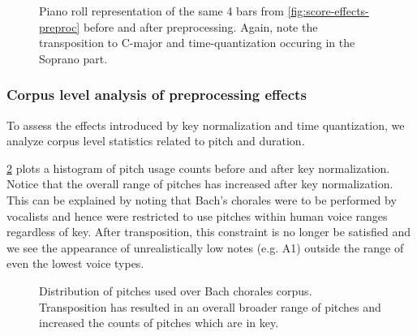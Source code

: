 \begin{figure}[p]
    \centering
        
        
    \caption{Piano roll representation of the same 4 bars from \cref{fig:score-effects-preproc}
      before and after preprocessing. Again, note the transposition to C-major
      and time-quantization occuring in the Soprano part.}
    \label{fig:piano-roll-effects-preproc}
\end{figure}

\subsubsection{Corpus level analysis of preprocessing effects}

To assess the effects introduced by key normalization and time quantization,
we analyze corpus level statistics related to pitch and duration.

\cref{fig:pitch-key-standardization} plots a histogram of pitch usage counts
before and after key normalization. Notice that the overall range of pitches
has increased after key normalization. This can be explained by noting that
Bach's chorales were to be performed by vocalists and hence were restricted to
use pitches within human voice ranges regardless of key. After transposition,
this constraint is no longer be satisfied and we see the appearance of
unrealistically low notes (e.g. A1) outside the range of even the lowest voice
types.

\begin{landscape}
  \begin{figure}[p]
    \centering
    \begin{subfigure}[c]{1.0\textwidth}
        \centering
        
        
    \end{subfigure}
    \begin{subfigure}[c]{1.0\textwidth}
        \centering
        
        
    \end{subfigure}
    \caption{Distribution of pitches used over Bach chorales corpus.
      Transposition has resulted in an overall broader range of pitches and
    increased the counts of pitches which are in key.}
    \label{fig:pitch-key-standardization}
  \end{figure}
\end{landscape}

